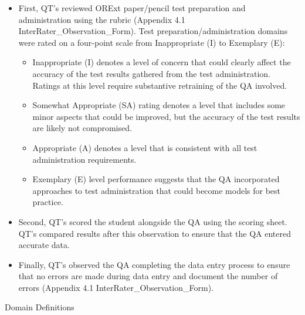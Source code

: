 \documentclass[]{article}
\providecommand{\tightlist}{%
  \setlength{\itemsep}{0pt}\setlength{\parskip}{0pt}}
\begin{document}
\begin{itemize}
\item
  First, QT's reviewed ORExt paper/pencil test preparation and
  administration using the rubric (Appendix 4.1
  InterRater\_Observation\_Form). Test preparation/administration
  domains were rated on a four-point scale from Inappropriate (I) to
  Exemplary (E):

  \begin{itemize}
  \tightlist
  \item
    Inappropriate (I) denotes a level of concern that could clearly
    affect the accuracy of the test results gathered from the test
    administration. Ratings at this level require substantive retraining
    of the QA involved.
  \item
    Somewhat Appropriate (SA) rating denotes a level that includes some
    minor aspects that could be improved, but the accuracy of the test
    results are likely not compromised.
  \item
    Appropriate (A) denotes a level that is consistent with all test
    administration requirements.
  \item
    Exemplary (E) level performance suggests that the QA incorporated
    approaches to test administration that could become models for best
    practice.
  \end{itemize}
\item
  Second, QT's scored the student alongside the QA using the scoring
  sheet. QT's compared results after this observation to ensure that the
  QA entered accurate data.
\item
  Finally, QT's observed the QA completing the data entry process to
  ensure that no errors are made during data entry and document the
  number of errors (Appendix 4.1 InterRater\_Observation\_Form).
\end{itemize}

Domain Definitions
\end{document}
